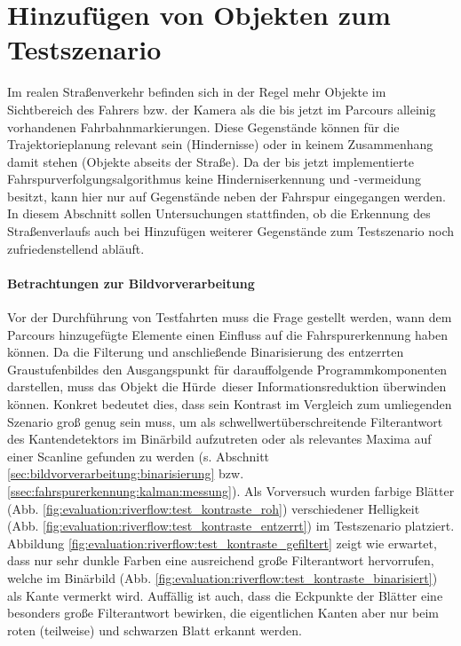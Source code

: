 \section{Hinzufügen von Objekten zum Testszenario \dcsecondauthorshort}
\label{ssec:evaluation:messungen:objekte_hinzufuegen}
Im realen Straßenverkehr befinden sich in der Regel mehr Objekte im Sichtbereich des Fahrers bzw. der Kamera als die bis jetzt im Parcours alleinig vorhandenen Fahrbahnmarkierungen. Diese Gegenstände können für die Trajektorieplanung relevant sein (Hindernisse) oder in keinem Zusammenhang damit stehen (Objekte abseits der Straße). Da der bis jetzt implementierte Fahrspurverfolgungsalgorithmus keine Hinderniserkennung und -vermeidung besitzt, kann hier nur auf Gegenstände neben der Fahrspur eingegangen werden. In diesem Abschnitt sollen Untersuchungen stattfinden, ob die Erkennung des Straßenverlaufs auch bei Hinzufügen weiterer Gegenstände zum Testszenario noch zufriedenstellend abläuft.

\paragraph{Betrachtungen zur Bildvorverarbeitung}
\label{par:evaluation:riverflow:messungen:objekte_hinzufuegen}
Vor der Durchführung von Testfahrten muss die Frage gestellt werden, wann dem Parcours hinzugefügte Elemente einen Einfluss auf die Fahrspurerkennung haben können. Da die Filterung und anschließende Binarisierung des entzerrten Graustufenbildes den Ausgangspunkt für darauffolgende Programmkomponenten darstellen, muss das Objekt die \glqq Hürde\grqq\ dieser Informationsreduktion überwinden können. Konkret bedeutet dies, dass sein Kontrast im Vergleich zum umliegenden Szenario groß genug sein muss, um als schwellwertüberschreitende Filterantwort des Kantendetektors im Binärbild aufzutreten oder als relevantes Maxima auf einer Scanline gefunden zu werden (s. Abschnitt \ref{sec:bildvorverarbeitung:binarisierung} bzw. \ref{ssec:fahrspurerkennung:kalman:messung}).
Als Vorversuch wurden farbige Blätter (Abb. \ref{fig:evaluation:riverflow:test_kontraste_roh}) verschiedener Helligkeit (Abb. \ref{fig:evaluation:riverflow:test_kontraste_entzerrt}) im Testszenario platziert. Abbildung \ref{fig:evaluation:riverflow:test_kontraste_gefiltert} zeigt wie erwartet, dass nur sehr dunkle Farben eine ausreichend große Filterantwort hervorrufen, welche im Binärbild (Abb. \ref{fig:evaluation:riverflow:test_kontraste_binarisiert}) als Kante vermerkt wird. Auffällig ist auch, dass die Eckpunkte der Blätter eine besonders große Filterantwort bewirken, die eigentlichen Kanten aber nur beim roten (teilweise) und schwarzen Blatt erkannt werden.

